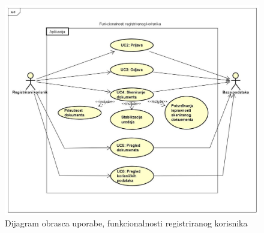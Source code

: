 				\begin{figure}[H]
					\includegraphics[scale=0.4]{slike/Funkcionalnosti registriranog korisnika} %
					\centering
					\caption{ Dijagram obrasca uporabe, funkcionalnosti registriranog korisnika}
					\label{fig:promjene}
				\end{figure}

